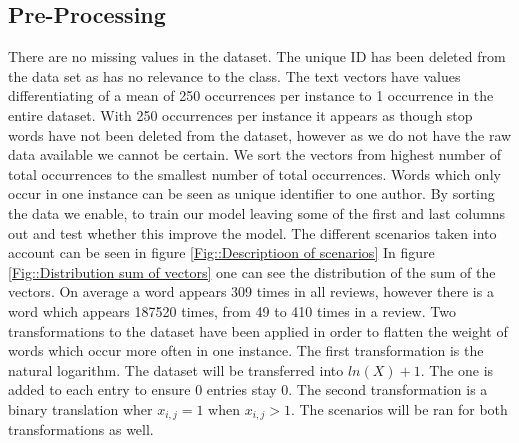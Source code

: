 \documentclass[11pt]{article}
\begin{document}
\subsection{Pre-Processing}
There are no missing values in the dataset. The unique ID has been deleted from the data set as has no relevance to the class. The text vectors have values differentiating of a mean of 250 occurrences per instance to 1 occurrence in the entire dataset. With 250 occurrences per instance it appears as though stop words have not been deleted from the dataset, however as we do not have the raw data available we cannot be certain. 
\newline
We sort the vectors from highest number of total occurrences to the smallest number of total occurrences. Words which only occur in one instance can be seen as unique identifier to one author. By sorting the data we enable, to train our model leaving some of the first and last columns out and test whether this improve the model. The different scenarios taken into account can be seen in figure \ref{Fig::Descriptioon of scenarios}
\newline
In figure \ref{Fig::Distribution sum of vectors} one can see the distribution of the sum of the vectors. On average a word appears 309 times in all reviews, however there is a word which appears 187520 times, from 49 to 410 times in a review.
\newline
Two transformations to the dataset have been applied in order to flatten the weight of words which occur more often in one instance. The first transformation is the natural logarithm. The dataset will be transferred into $ln(X)+1$. The one is added to each entry to ensure 0 entries stay 0. The second transformation is a binary translation wher $x_{i,j}=1$ when $x_{i,j}>1$. The scenarios will be ran for both transformations as well.  
%
\end{document}
